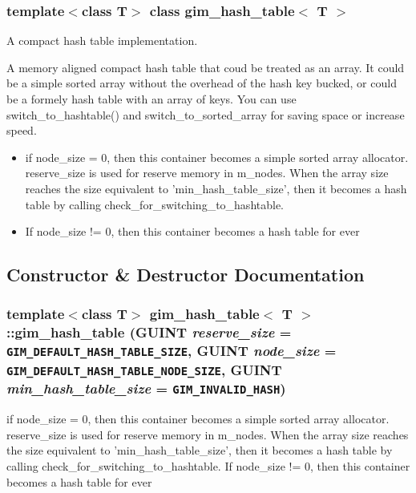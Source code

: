 \subsubsection*{template$<$class T$>$ class gim\_\-hash\_\-table$<$ T $>$}

A compact hash table implementation. 

A memory aligned compact hash table that coud be treated as an array. It could be a simple sorted array without the overhead of the hash key bucked, or could be a formely hash table with an array of keys. You can use switch\_\-to\_\-hashtable() and switch\_\-to\_\-sorted\_\-array for saving space or increase speed. 

\begin{itemize}
\item if node\_\-size = 0, then this container becomes a simple sorted array allocator. reserve\_\-size is used for reserve memory in m\_\-nodes. When the array size reaches the size equivalent to 'min\_\-hash\_\-table\_\-size', then it becomes a hash table by calling check\_\-for\_\-switching\_\-to\_\-hashtable. \item If node\_\-size != 0, then this container becomes a hash table for ever \end{itemize}


\subsection{Constructor \& Destructor Documentation}
\hypertarget{classgim__hash__table_efe21c907c69c8077ec0886aaa778f6f}{
\subsubsection[gim\_\-hash\_\-table]{\setlength{\rightskip}{0pt plus 5cm}template$<$class T$>$ {\bf gim\_\-hash\_\-table}$<$ T $>$::{\bf gim\_\-hash\_\-table} (GUINT {\em reserve\_\-size} = {\tt GIM\_\-DEFAULT\_\-HASH\_\-TABLE\_\-SIZE}, \/  GUINT {\em node\_\-size} = {\tt GIM\_\-DEFAULT\_\-HASH\_\-TABLE\_\-NODE\_\-SIZE}, \/  GUINT {\em min\_\-hash\_\-table\_\-size} = {\tt GIM\_\-INVALID\_\-HASH})}}
\label{classgim__hash__table_efe21c907c69c8077ec0886aaa778f6f}


if node\_\-size = 0, then this container becomes a simple sorted array allocator. reserve\_\-size is used for reserve memory in m\_\-nodes. When the array size reaches the size equivalent to 'min\_\-hash\_\-table\_\-size', then it becomes a hash table by calling check\_\-for\_\-switching\_\-to\_\-hashtable.  If node\_\-size != 0, then this container becomes a hash table for ever  

